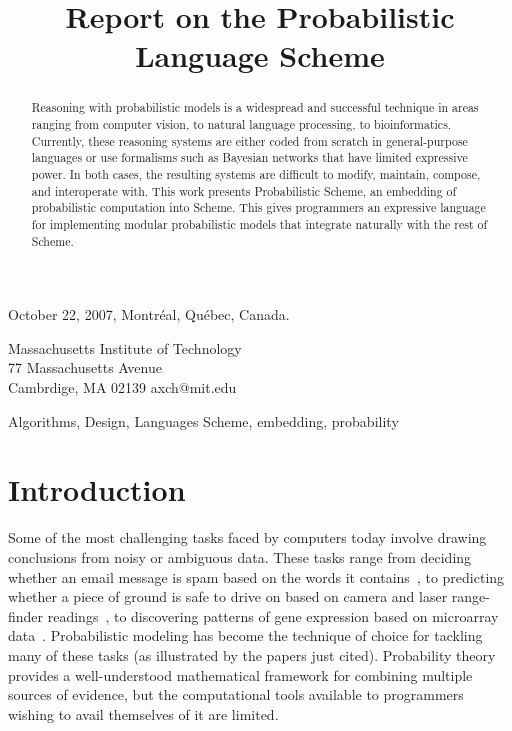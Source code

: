 \documentclass[10pt]{sigplanconf}
\begin{document}
\title{Report on the Probabilistic Language Scheme}

 {October 22, 2007, Montr{\'e}al, Qu{\'e}bec, Canada.}



           {Massachusetts Institute of Technology \\ 77 Massachusetts Avenue \\ Cambrdige, MA 02139}
           {axch@mit.edu}

\maketitle

\begin{abstract}
Reasoning with probabilistic models is a widespread and
successful technique in areas ranging from computer vision, to natural
language processing, to bioinformatics.  Currently, these reasoning
systems are either coded from scratch in general-purpose languages or
use formalisms such as Bayesian networks that have limited expressive
power.  In both cases, the resulting systems are difficult to modify,
maintain, compose, and interoperate with.  This work presents Probabilistic
Scheme, an embedding of probabilistic computation into Scheme.  This
gives programmers an expressive language for implementing modular
probabilistic models that integrate naturally with the rest of Scheme.
\end{abstract}

\terms Algorithms, Design, Languages
\keywords Scheme, embedding, probability

\section{Introduction}
\label{introduction}

Some of the most challenging tasks faced by computers today involve
drawing conclusions from noisy or ambiguous data.  These tasks range
from deciding whether an email message is spam based on the words it
contains~\cite{sahami1998baf}, to predicting whether a piece of ground
is safe to drive on based on camera and laser range-finder
readings~\cite{thrun2006pta}, to discovering patterns of gene
expression based on microarray data~\cite{segal2001rpm}.
Probabilistic modeling has become the technique of choice for tackling
many of these tasks (as illustrated by the papers just cited).
Probability theory provides a well-understood mathematical framework
for combining multiple sources of evidence, but the computational
tools available to programmers wishing to avail themselves of it are
limited.
\end{document}
